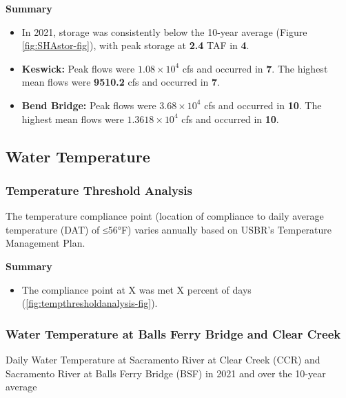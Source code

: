 \documentclass[
]{book}
\providecommand{\tightlist}{%
  \setlength{\itemsep}{0pt}\setlength{\parskip}{0pt}}
\theoremstyle{definition}
\theoremstyle{definition}
\theoremstyle{definition}
\theoremstyle{definition}
\theoremstyle{remark}
\begin{document}
\textbf{Summary}

\begin{itemize}
\tightlist
\item
  In 2021, storage was consistently below the 10-year average (Figure \ref{fig:SHAstor-fig}), with peak storage at \textbf{2.4} TAF in \textbf{4}.
\item
  \textbf{Keswick:} Peak flows were \textbf{\ensuremath{1.08\times 10^{4}}} cfs and occurred in \textbf{7}. The highest mean flows were \textbf{9510.2} cfs and occurred in \textbf{7}.
\item
  \textbf{Bend Bridge:} Peak flows were \textbf{\ensuremath{3.68\times 10^{4}}} cfs and occurred in \textbf{10}. The highest mean flows were \textbf{\ensuremath{1.3618\times 10^{4}}} cfs and occurred in \textbf{10}.
\end{itemize}

\hypertarget{water-temperature}{%
\subsection{Water Temperature}\label{water-temperature}}

\hypertarget{temp-thresholds}{%
\subsubsection{Temperature Threshold Analysis}\label{temp-thresholds}}

The temperature compliance point (location of compliance to daily average temperature (DAT) of ≤56°F) varies annually based on USBR's Temperature Management Plan.

\textbf{Summary}

\begin{itemize}
\tightlist
\item
  The compliance point at X was met X percent of days (\ref{fig:tempthresholdanalysis-fig}).
\end{itemize}

\hypertarget{water-temperature-at-balls-ferry-bridge-and-clear-creek}{%
\subsubsection{Water Temperature at Balls Ferry Bridge and Clear Creek}\label{water-temperature-at-balls-ferry-bridge-and-clear-creek}}

\label{fig:historicalwtemp-fig}Daily Water Temperature at Sacramento River at Clear Creek (CCR) and Sacramento River at Balls Ferry Bridge (BSF) in 2021 and over the 10-year average
\end{document}
